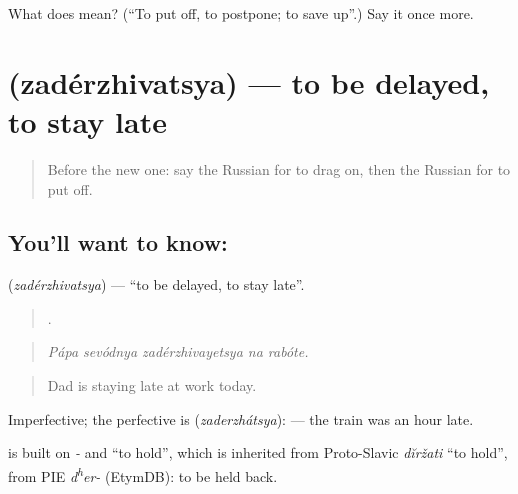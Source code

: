\begin{tcolorbox}[breakable,colback=teal!4,colframe=teal!35!black,title={Before you move on}]
What does  mean? (\textquotedblleft{}To put off, to postpone; to save up\textquotedblright{}.) Say it once more.
\end{tcolorbox}
\section[\texorpdfstring{\ru{задерживаться} (zadérzhivatsya)}{задерживаться (zadérzhivatsya)}]{ (zadérzhivatsya) — to be delayed, to stay late}

\label{lesson:RU-C275-zaderzhivatsya}



\begin{quote}
Before the new one: say the Russian for to drag on, then the Russian for to put off.
\end{quote}

\subsection*{You'll want to know: }
\textbf{} (\emph{zadérzhivatsya}) — \textquotedblleft{}to be delayed, to stay late\textquotedblright{}.

\begin{quote}
    .
\end{quote}

\begin{quote}
\emph{Pápa sevódnya zadérzhivayetsya na rabóte.}
\end{quote}

\begin{quote}
Dad is staying late at work today.
\end{quote}

Imperfective; the perfective is \emph{} (\emph{zaderzhátsya}): \emph{   } — the train was an hour late.

\begin{cousinweb}
\emph{} is built on \emph{-} and \emph{} \textquotedblleft{}to hold\textquotedblright{}, which is inherited from Proto-Slavic \emph{dĭržati} \textquotedblleft{}to hold\textquotedblright{}, from PIE \emph{d\textsuperscript{h}er-} (EtymDB): to be held back.
\end{cousinweb}

